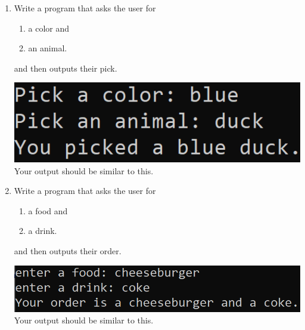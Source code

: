 \documentclass{article}
\begin{document}
\begin{enumerate}
	\item 
		Write a program that asks the user for \\
		\begin{minipage}{0.5\textwidth}
		\vspace*{-0.5em}
			\begin{enumerate}  \setlength\itemsep{-0.3em}
				\item a color and
				\item an animal.  
			\end{enumerate} \vspace*{-1ex}
		and then outputs their pick.
		\end{minipage}
		\begin{minipage}{0.5\textwidth}
			\centering
			\includegraphics[scale=0.75]{./imgs/outputAnimalColor.png}\\
			Your output should be similar to this.
		\end{minipage}



	\item 
		Write a program that asks the user for \\
		\begin{minipage}{0.5\textwidth}
		\vspace*{-0.5em}
			\begin{enumerate}  \setlength\itemsep{-0.3em}
				\item a food and
				\item a drink.  
			\end{enumerate} \vspace*{-1ex}
		and then outputs their order.
		\end{minipage}
		\begin{minipage}{0.5\textwidth}
			\centering
			\includegraphics[scale=0.75]{./imgs/outputFoodAndDrink.png}\\
			Your output should be similar to this.
		\end{minipage}




\end{enumerate}
\end{document}
